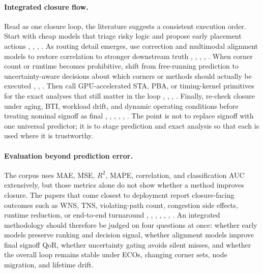 \documentclass[num-refs]{wiley-article}
\begin{document}
    \paragraph{Integrated closure flow.} Read as one closure loop, the literature suggests a consistent execution order. Start with cheap models that triage risky logic and propose early placement actions \cite{ref27}, \cite{ref29}, \cite{ref1}, \cite{ref3}. As routing detail emerges, use correction and multimodal alignment models to restore correlation to stronger downstream truth \cite{ref25}, \cite{ref13}, \cite{ref17}, \cite{ref8}, \cite{ref10}. When corner count or runtime becomes prohibitive, shift from free-running prediction to uncertainty-aware decisions about which corners or methods should actually be executed \cite{ref28}, \cite{ref16}, \cite{ref9}. Then call GPU-accelerated STA, PBA, or timing-kernel primitives for the exact analyses that still matter in the loop \cite{ref21}, \cite{ref22}, \cite{ref11}, \cite{ref12}. Finally, re-check closure under aging, BTI, workload drift, and dynamic operating conditions before treating nominal signoff as final \cite{ref14}, \cite{ref15}, \cite{ref23}, \cite{ref26}, \cite{ref38}, \cite{ref44}. The point is not to replace signoff with one universal predictor; it is to stage prediction and exact analysis so that each is used where it is trustworthy.


    \paragraph{Evaluation beyond prediction error.} The corpus uses MAE, MSE, $R^2$, MAPE, correlation, and classification AUC extensively, but those metrics alone do not show whether a method improves closure. The papers that come closest to deployment report closure-facing outcomes such as WNS, TNS, violating-path count, congestion side effects, runtime reduction, or end-to-end turnaround \cite{ref1}, \cite{ref7}, \cite{ref10}, \cite{ref16}, \cite{ref17}, \cite{ref19}, \cite{ref22}. An integrated methodology should therefore be judged on four questions at once: whether early models preserve ranking and decision signal, whether alignment models improve final signoff QoR, whether uncertainty gating avoids silent misses, and whether the overall loop remains stable under ECOs, changing corner sets, node migration, and lifetime drift.
\end{document}
